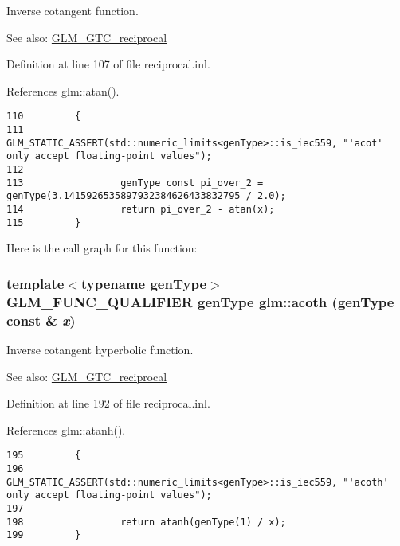 Inverse cotangent function.

\begin{Desc}
\item[See also:]\hyperlink{group__gtc__reciprocal}{GLM\_\-GTC\_\-reciprocal} \end{Desc}


Definition at line 107 of file reciprocal.inl.

References glm::atan().

\begin{Code}\begin{verbatim}110         {
111                 GLM_STATIC_ASSERT(std::numeric_limits<genType>::is_iec559, "'acot' only accept floating-point values");
112 
113                 genType const pi_over_2 = genType(3.1415926535897932384626433832795 / 2.0);
114                 return pi_over_2 - atan(x);
115         }
\end{verbatim}
\end{Code}




Here is the call graph for this function:\hypertarget{group__gtc__reciprocal_g651e435e3e8f63b1ea1da0e5e7581864}{
\subsubsection[acoth]{\setlength{\rightskip}{0pt plus 5cm}template$<$typename genType$>$ GLM\_\-FUNC\_\-QUALIFIER genType glm::acoth (genType const \& {\em x})}}
\label{group__gtc__reciprocal_g651e435e3e8f63b1ea1da0e5e7581864}


Inverse cotangent hyperbolic function.

\begin{Desc}
\item[See also:]\hyperlink{group__gtc__reciprocal}{GLM\_\-GTC\_\-reciprocal} \end{Desc}


Definition at line 192 of file reciprocal.inl.

References glm::atanh().

\begin{Code}\begin{verbatim}195         {
196                 GLM_STATIC_ASSERT(std::numeric_limits<genType>::is_iec559, "'acoth' only accept floating-point values");
197 
198                 return atanh(genType(1) / x);
199         }
\end{verbatim}
\end{Code}





